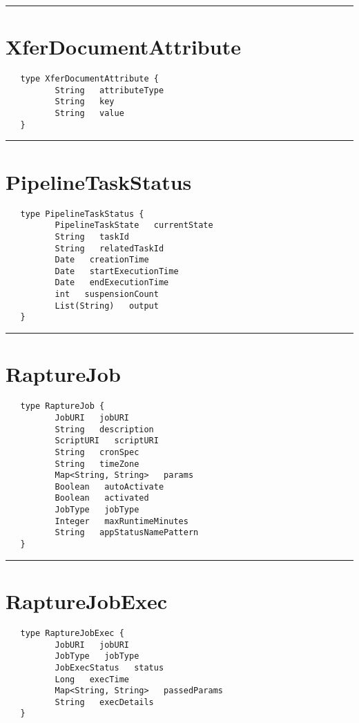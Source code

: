\rule{15cm}{2pt}
\section{XferDocumentAttribute}
\label{type:XferDocumentAttribute}

\begin{verbatim}
   type XferDocumentAttribute {
          String   attributeType
          String   key
          String   value
   }
\end{verbatim}

\rule{15cm}{2pt}
\section{PipelineTaskStatus}
\label{type:PipelineTaskStatus}

\begin{verbatim}
   type PipelineTaskStatus {
          PipelineTaskState   currentState
          String   taskId
          String   relatedTaskId
          Date   creationTime
          Date   startExecutionTime
          Date   endExecutionTime
          int   suspensionCount
          List(String)   output
   }
\end{verbatim}

\rule{15cm}{2pt}
\section{RaptureJob}
\label{type:RaptureJob}

\begin{verbatim}
   type RaptureJob {
          JobURI   jobURI
          String   description
          ScriptURI   scriptURI
          String   cronSpec
          String   timeZone
          Map<String, String>   params
          Boolean   autoActivate
          Boolean   activated
          JobType   jobType
          Integer   maxRuntimeMinutes
          String   appStatusNamePattern
   }
\end{verbatim}

\rule{15cm}{2pt}
\section{RaptureJobExec}
\label{type:RaptureJobExec}

\begin{verbatim}
   type RaptureJobExec {
          JobURI   jobURI
          JobType   jobType
          JobExecStatus   status
          Long   execTime
          Map<String, String>   passedParams
          String   execDetails
   }
\end{verbatim}

